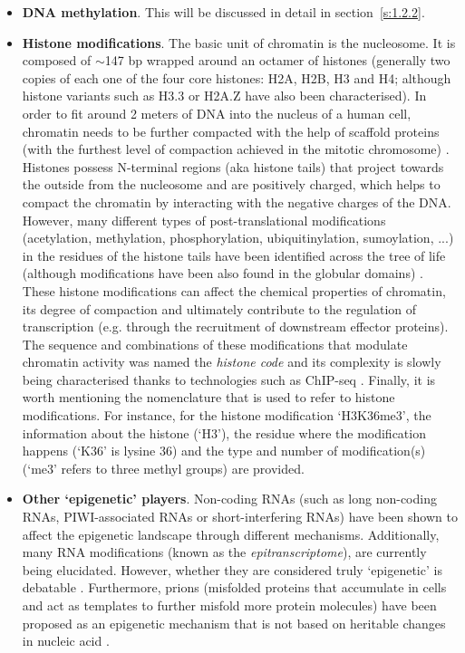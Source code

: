 \begin{itemize}
	
	\item \textbf{DNA methylation}. This will be discussed in detail in section~\ref{s:1.2.2}.
	
	\item \textbf{Histone modifications}. The basic unit of chromatin is the nucleosome. It is composed of $\sim$147 \acrshort{bp} wrapped around an octamer of histones (generally two copies of each one of the four core histones: H2A, H2B, H3 and H4; although histone variants such as H3.3 or H2A.Z have also been characterised). In order to fit around 2 meters of DNA into the nucleus of a human cell, chromatin needs to be further compacted with the help of scaffold proteins (with the furthest level of compaction achieved in the mitotic chromosome) \cite{Ou2017}. Histones possess N-terminal regions (aka histone tails) that project towards the outside from the nucleosome and are positively charged, which helps to compact the chromatin by interacting with the negative charges of the DNA. However, many different types of post-translational modifications (acetylation, methylation, phosphorylation, ubiquitinylation, sumoylation, ...) in the residues of the histone tails have been identified across the tree of life (although modifications have been also found in the globular domains) \cite{Lawrence2016}. These histone modifications can affect the chemical properties of chromatin, its degree of compaction and ultimately contribute to the regulation of transcription (e.g. through the recruitment of downstream effector proteins). The sequence and combinations of these modifications that modulate chromatin activity was named the \textit{histone code} \cite{Strahl2000} and its complexity is slowly being characterised thanks to technologies such as \acrshort{ChIP-seq} \cite{Consortium2012, Consortium2015}. Finally, it is worth mentioning the nomenclature that is used to refer to histone modifications. For instance, for the histone modification `H3K36me3', the information about the histone (`H3'), the residue where the modification happens (`K36' is lysine 36) and the type and number of modification(s) (`me3' refers to three methyl groups) are provided.

	\item \textbf{Other `epigenetic' players}. Non-coding RNAs (such as long non-coding RNAs, PIWI-associated RNAs or short-interfering RNAs) have been shown to affect the epigenetic landscape through different mechanisms. Additionally, many RNA modifications (known as the \textit{epitranscriptome}), are currently being elucidated. However, whether they are considered truly `epigenetic' is debatable \cite{Mattick2009,Morris2014}. Furthermore, prions (misfolded proteins that accumulate in cells and act as templates to further misfold more protein molecules) have been proposed as an epigenetic mechanism that is not based on heritable changes in nucleic acid \cite{Halfmann2010}.
	
	
\end{itemize}

